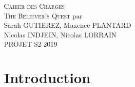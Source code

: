 \documentclass[]{extarticle}
\begin{document}
\textsc{ }\\
\textsc{ }\\
\textsc{ }\\
\textsc{ }\\
\textsc{ }\\

\begin{center}
\textsc{\LARGE Cahier des Charges} \\
\bigbreak
\bigbreak
\bigbreak
\textsc{\Huge The Believer's Quest}
\bigbreak
\bigbreak
\bigbreak
\bigbreak
\bigbreak
\bigbreak
\bigbreak
\bigbreak
\bigbreak
\bigbreak
\bigbreak
\bigbreak
\bigbreak
par \\
Sarah GUTIEREZ, Maxence PLANTARD \\
Nicolas INDJEIN, Nicolas LORRAIN \\
\bigbreak
\bigbreak
\bigbreak
PROJET S2 2019
\end{center}
\newpage

\renewcommand{\contentsname}{Sommaire}
\tableofcontents
\newpage

\section{Introduction}
\end{document}
